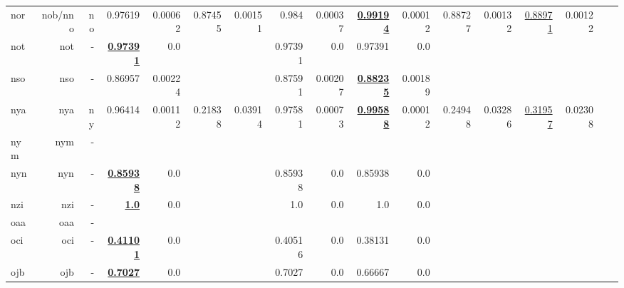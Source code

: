 \documentclass[11pt]{article}
\begin{document}
\begin{table*}[h]
{\begin{tabular}{lrrrrrrrrrrrrrrrr}
nor         & nob/nno         & no         & 0.97619         & 0.00062         & 0.87455         & 0.00151         & 0.984         & 0.00037         & \textbf{\underline{0.99194}}         & 0.00012         & 0.88727         & 0.00132         & \underline{0.88971}         & 0.00122         \\
not         & not         & -         & \textbf{\underline{0.97391}}         & 0.0         &          &          & 0.97391         & 0.0         & 0.97391         & 0.0         &          &          &          &          \\
nso         & nso         & -         & 0.86957         & 0.00224         &          &          & 0.87591         & 0.00207         & \textbf{\underline{0.88235}}         & 0.00189         &          &          &          &          \\
nya         & nya         & ny         & 0.96414         & 0.00112         & 0.21838         & 0.03914         & 0.97581         & 0.00073         & \textbf{\underline{0.99588}}         & 0.00012         & 0.24948         & 0.03286         & \underline{0.31957}         & 0.02308         \\
nym         & nym         & -         &          &          &          &          &          &          &          &          &          &          &          &          \\
nyn         & nyn         & -         & \textbf{\underline{0.85938}}         & 0.0         &          &          & 0.85938         & 0.0         & 0.85938         & 0.0         &          &          &          &          \\
nzi         & nzi         & -         & \textbf{\underline{1.0}}         & 0.0         &          &          & 1.0         & 0.0         & 1.0         & 0.0         &          &          &          &          \\
oaa         & oaa         & -         &          &          &          &          &          &          &          &          &          &          &          &          \\
oci         & oci         & -         & \textbf{\underline{0.41101}}         & 0.0         &          &          & 0.40516         & 0.0         & 0.38131         & 0.0         &          &          &          &          \\
ojb         & ojb         & -         & \textbf{\underline{0.7027}}         & 0.0         &          &          & 0.7027         & 0.0         & 0.66667         & 0.0         &          &          &          &          \\

\end{tabular}}
\end{table*}
\end{document}
